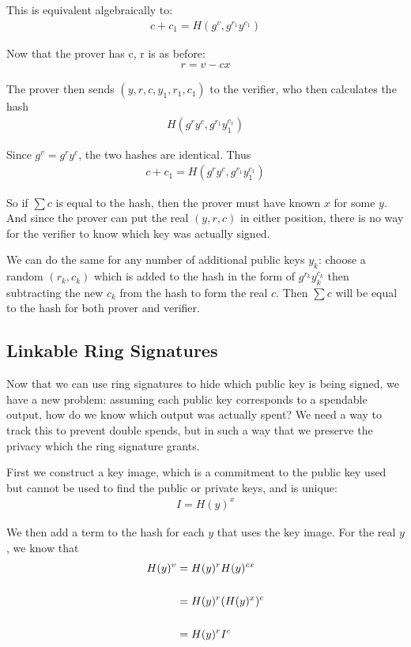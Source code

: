 \documentclass{article}
\begin{document}
This is equivalent algebraically to:
\begin{align}
  c + c_1 = H(g^v, g^{r_1} y^{c_1})
\end{align}

Now that the prover has c, r is as before:
\begin{align}
  r = v - cx
\end{align}

The prover then sends $(y, r, c, y_1, r_1, c_1)$ to the verifier, who then calculates the hash
\begin{align}
  H(g^r y^c, g^{r_1} y_1^{c_1})
\end{align}

Since $g^v = g^r y^c$, the two hashes are identical.  Thus 
\begin{align}
  c + c_1 = H(g^r y^c, g^{r_1} y_1^{c_1})
\end{align}

So if $\sum c$ is equal to the hash, then the prover must have known $x$ for some $y$.  And since the prover can put the real $(y,r,c)$ in either position, there is no way for the verifier to know which key was actually signed.

We can do the same for any number of additional public keys $y_k$: choose a random $(r_k,c_k)$ which is added to the hash in the form of $g^{r_k}y_k^{c_k}$ then subtracting the new $c_k$ from the hash to form the real $c$. Then $\sum c$ will be equal to the hash for both prover and verifier.



\subsection{Linkable Ring Signatures}

Now that we can use ring signatures to hide which public key is being signed, we have a new problem: assuming each public key corresponds to a spendable output, how do we know which output was actually spent?  We need a way to track this to prevent double spends, but in such a way that we preserve the privacy which the ring signature grants.

First we construct a key image, which is a commitment to the public key used but cannot be used to find the public or private keys, and is unique:
\begin{align}
  I = H(y)^x
\end{align}

We then add a term to the hash for each $y$ that uses the key image.  For the real $y$, we know that
\begin{align}
  H(y)^v &= H(y)^r H(y)^{cx}\\
  \cr &= H(y)^r (H(y)^x)^c\\
  \cr &= H(y)^r I^c
\end{align}
\end{document}
